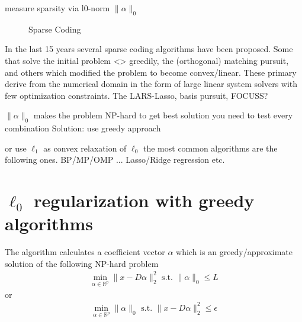 measure sparsity via       l0-norm       $\lVert\alpha\rVert_{0}$

\begin{figure}
\centering
\caption{Sparse Coding}
\label{fig:da_x}
\end{figure}


In the last 15 years several sparse coding algorithms have been proposed. 
Some that solve the initial problem <> greedily, the (orthogonal) matching pursuit, and others which modified the problem to become convex/linear. These primary derive from the numerical domain in the form of 
large linear system solvers with few optimization constraints. The LARS-Lasso, basis pursuit, FOCUSS?


$\lVert\alpha\rVert_{0}$ makes the problem NP-hard
to get best solution you need to test every combination
Solution:
use greedy approach 

or use $\ell_1$ as convex relaxation of $\ell_0$
the most common algorithms are the following ones.
BP/MP/OMP ...
Lasso/Ridge regression etc.



\section{$\ell_0$ regularization with greedy algorithms}

The algorithm calculates a coefficient vector $\alpha$ which is an greedy/approximate solution of the following NP-hard problem
\begin{align}
\min_{\alpha\in\mathbb{R}^{p}}  \lVert x - D\alpha \rVert^{2}_{2} \textrm{ s.t. } \lVert \alpha \rVert_{0} \leq L
\end{align}
or
\begin{align}
\min_{\alpha\in\mathbb{R}^{p}}   \lVert \alpha \rVert_{0}   \textrm{ s.t. } \lVert x - D\alpha \rVert^{2}_{2} \leq \epsilon
\end{align}
\cite{Mallat1993}

